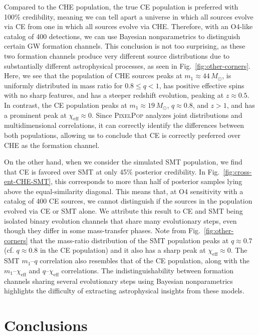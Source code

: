 \documentclass[twocolumn, twocolappendix]{aastex631}
\newcommand{\chieff}{\ensuremath{\chi_\mathrm{eff}}}
\newcommand{\Msun}{M_\odot}
\newcommand{\PixelPop}{\textsc{PixelPop}\xspace}
\begin{document}
Compared to the CHE population, the true CE population is preferred with 100\% credibility, meaning we can tell apart a universe in which all sources evolve via CE from one in which all sources evolve via CHE. Therefore, with an O4-like catalog of 400 detections, we can use Bayesian nonparametrics to distinguish certain GW formation channels. This conclusion is not too surprising, as these two formation channels produce very different source distributions due to substantially different astrophysical processes, as seen in Fig.~\ref{fig:other-corners}. Here, we see that the population of \ac{CHE} sources peaks at $m_1 \approx 44\,\Msun$, is uniformly distributed in mass ratio for $0.8 \leq q < 1$, has positive effective spins with no sharp features, and has a steeper redshift evolution, peaking at $z\approx0.5$. In contrast, the \ac{CE} population peaks at $m_1\approx19\,M_\odot$, $q\approx0.8$, and $z>1$, and has a prominent peak at $\chieff\approx0$. Since \PixelPop analyzes joint distributions and multidimensional correlations, it can correctly identify the differences between both populations, allowing us to conclude that \ac{CE} is correctly preferred over \ac{CHE} as the formation channel.

On the other hand, when we consider the simulated \ac{SMT} population, we find that \ac{CE} is favored over \ac{SMT} at only 45\% posterior credibility. In Fig.~\ref{fig:cross-ent-CHE-SMT}, this corresponds to more than half of posterior samples lying above the equal-similarity diagonal. This means that, at O4 sensitivity with a catalog of 400 \ac{CE} sources, we cannot distinguish if the sources in the population evolved via \ac{CE} or \ac{SMT} alone. We attribute this result to \ac{CE} and \ac{SMT} being isolated binary evolution channels that share many evolutionary steps, even though they differ in some mass-transfer phases. Note from Fig.~\ref{fig:other-corners} that the mass-ratio distribution of the \ac{SMT} population peaks at $q\approx0.7$ (cf. $q\approx0.8$ in the \ac{CE} population) and it also has a sharp peak at $\chieff\approx0$. The SMT $m_1$--$q$ correlation also resembles that of the \ac{CE} population, along with the $m_1$--$\chieff$ and $q$--$\chieff$ correlations. The indistinguishability between formation channels sharing several evolutionary steps using Bayesian nonparametrics highlights the difficulty of extracting astrophysical insights from these models.

\section{Conclusions}
\label{sec:conclusions}
\end{document}
